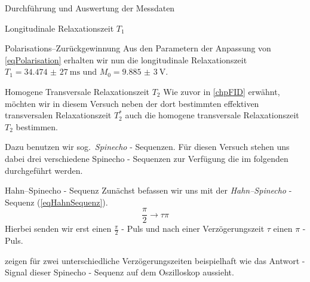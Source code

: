 \documentclass[pdftex, a4paper,11pt, twoside, ngerman]{report}
\begin{document}
\begin{chapter}{Durchführung und Auswertung der Messdaten}
\begin{section}{
        Longitudinale Relaxationszeit $T_{1}$}
\begin{subsection}{Polarisations--Zurückgewinnung}
        Aus den Parametern der Anpassung von \cref{eqPolarisation} erhalten
        wir nun die longitudinale Relaxationszeit
        $T_{1}=\SI{34,474(27)}{\milli\second}$ und $M_{0}=\SI{9,885(3)}{\volt}$.
        
      \end{subsection}
      
      
    \end{section}
    
    
    
    \begin{section}{
        Homogene Transversale Relaxationszeit $T_{2}$}
      \label{chpHomoTransRelax}
      Wie zuvor in \cref{chpFID} erwähnt, möchten wir in diesem Versuch neben
      der dort bestimmten effektiven transversalen Relaxationszeit $T_{2}^{*}$
      auch die homogene transversale Relaxationszeit $T_{2}$ bestimmen.
      
      Dazu benutzen wir sog.\ \textit{Spinecho} - Sequenzen.
      Für diesen Versuch stehen uns dabei drei verschiedene Spinecho - Sequenzen
      zur Verfügung die im folgenden durchgeführt werden.
      
      \begin{subsection}{Hahn--Spinecho - Sequenz}
        \label{chpHomoTransRelaxHahn}
        Zunächst befassen wir uns mit der \textit{Hahn--Spinecho} - Sequenz
        (\cref{eqHahnSequenz}).
        \begin{equation}
          \label{eqHahnSequenz}
          \frac{\pi}{2} \rightarrow \tau \pi
        \end{equation}
        Hierbei senden wir erst einen $\frac{\pi}{2}$ - Puls und nach einer
        Verzögerungszeit $\tau$ einen $\pi$ - Puls.
        
         zeigen für zwei unterschiedliche
        Verzögerungszeiten beispielhaft wie das Antwort - Signal dieser
        Spinecho - Sequenz auf dem Oszilloskop aussieht.
        

\end{subsection}
\end{section}
\end{chapter}
\end{document}
